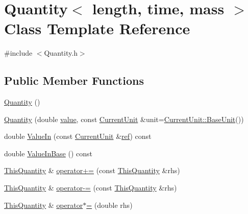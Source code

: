\hypertarget{class_quantity}{\section{Quantity$<$ length, time, mass $>$ Class Template Reference}
\label{class_quantity}
}


{\ttfamily \#include $<$Quantity.\+h$>$}

\subsection*{Public Member Functions}
\begin{DoxyCompactItemize}
\item 
\hyperlink{class_quantity_a9afc7e790ade60a644248a2654986443}{Quantity} ()
\item 
\hyperlink{class_quantity_ab4e1d4f62c6622bd0d7fcac6cc9b017f}{Quantity} (double \hyperlink{glext_8h_a79169be77d7e02a24f68a5bfe627dc29}{value}, const \hyperlink{class_unit}{Current\+Unit} \&unit=\hyperlink{class_unit_aa2102921ecd21d9938707db58e4df964}{Current\+Unit\+::\+Base\+Unit}())
\item 
double \hyperlink{class_quantity_af5aafbb8de9a913f79fcb0c80fc76d5a}{Value\+In} (const \hyperlink{class_unit}{Current\+Unit} \&\hyperlink{glext_8h_ad32bdec748ba376f6c0d2df39ab9a95b}{ref}) const 
\item 
double \hyperlink{class_quantity_a0bda6b05016d15deaa35f4ddf3ffd71f}{Value\+In\+Base} () const 
\item 
\hyperlink{class_quantity}{This\+Quantity} \& \hyperlink{class_quantity_a87ccb1a4f7497d0ccc96d70cae6755c2}{operator+=} (const \hyperlink{class_quantity}{This\+Quantity} \&rhs)
\item 
\hyperlink{class_quantity}{This\+Quantity} \& \hyperlink{class_quantity_a2b505bf1f41b7eadca3a1e31ff229890}{operator-\/=} (const \hyperlink{class_quantity}{This\+Quantity} \&rhs)
\item 
\hyperlink{class_quantity}{This\+Quantity} \& \hyperlink{class_quantity_acc1223e048130a379766f1d9114059a9}{operator$\ast$=} (double rhs)
\end{DoxyCompactItemize}
